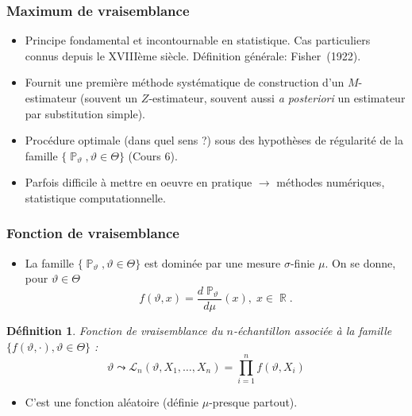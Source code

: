 ﻿\documentclass{beamer}
\newtheorem{df}{Définition}
\DeclareMathOperator{\R}{{\mathbb R}}
\DeclareMathOperator{\PP}{{\mathbb P}}
\begin{document}
\begin{frame}
\frametitle{Maximum de vraisemblance}
\begin{itemize}
\item Principe {\color{red} fondamental} et
{\color{red}incontournable} en statistique. Cas particuliers connus
depuis le XVIII\`eme si\`ecle. D\'efinition g\'en\'erale:
Fisher~(1922).
\item Fournit une première {\color{red}méthode systématique} de construction d'un $M$-estimateur
(souvent un $Z$-estimateur, souvent aussi {\it a posteriori} un
estimateur par substitution simple).
\item Procédure {\color{red}optimale} (dans quel sens ?)
sous des hypothèses de {\color{red} régularité} de la famille
$\{\PP_\vartheta, \vartheta \in \Theta\}$ (Cours 6).
\item Parfois difficile à mettre en oeuvre en pratique
$\rightarrow$ {\color{red}méthodes numériques}, statistique
computationnelle.
\end{itemize}
\end{frame}

\begin{frame}
\frametitle{Fonction de vraisemblance}
\begin{itemize}
\item La famille $\{\PP_\vartheta,\vartheta \in \Theta\}$ est dominée par une mesure $\sigma$-finie $\mu$. On se donne, pour $\vartheta \in \Theta$
$$f(\vartheta,x) = \frac{d\PP_\vartheta}{d\mu}(x),\;x \in \R.$$
\end{itemize}
\begin{df}
{\color{red}Fonction de vraisemblance} du $n$-échantillon associée à la famille $\{f(\vartheta,\cdot),\vartheta \in \Theta\}$ :
$$\boxed{\vartheta \leadsto {\mathcal L}_n(\vartheta, X_1,\ldots, X_n) = \prod_{i = 1}^n f(\vartheta, X_i)}$$
\end{df}
\begin{itemize}
\item C'est une fonction aléatoire (définie $\mu$-presque partout).
\end{itemize}
\end{frame}
\end{document}
